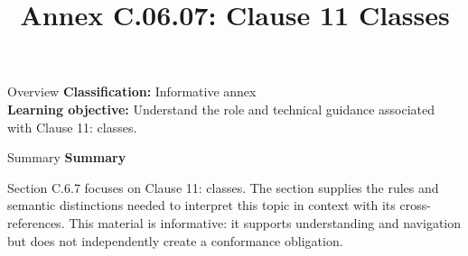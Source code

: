 \documentclass[10pt,letterpaper]{article}
\title{Annex C.06.07: Clause 11 Classes}
\author{}
\date{}
\begin{document}
\maketitle
\begin{CornellOverviewBox}{Overview}
\textbf{Classification:} Informative annex\\[2pt]
\textbf{Learning objective:} Understand the role and technical guidance associated with Clause 11: classes.
\end{CornellOverviewBox}\begin{CornellSummaryBox}{Summary}
{\sffamily\bfseries\color{Accent} Summary}\par\vspace{3pt}Section C.6.7 focuses on Clause 11: classes. The section supplies the rules and semantic distinctions needed to interpret this topic in context with its cross-references. This material is informative: it supports understanding and navigation but does not independently create a conformance obligation.
\end{CornellSummaryBox}
\end{document}
